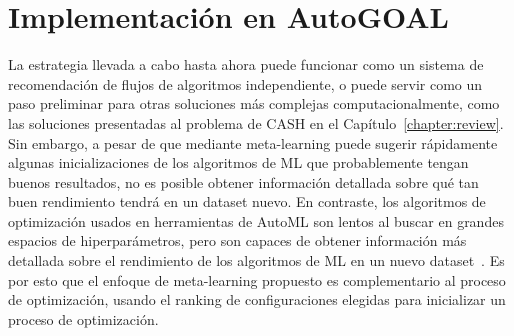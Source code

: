
\section{Implementación en AutoGOAL}\label{sec:autogoal_imp}


La estrategia llevada a cabo hasta ahora puede funcionar como un sistema de recomendación de flujos de algoritmos independiente, o puede servir como un paso preliminar para otras soluciones más complejas computacionalmente, como las soluciones presentadas al problema de CASH en el Capítulo~\ref{chapter:review}. Sin embargo, a pesar de que mediante meta-learning puede sugerir rápidamente algunas inicializaciones de los algoritmos de ML que probablemente tengan buenos resultados, no es posible obtener información detallada sobre qué tan buen rendimiento tendrá en un dataset nuevo. En contraste, los algoritmos de optimización usados en herramientas de AutoML son lentos al buscar en grandes espacios de hiperparámetros, pero son capaces de obtener información más detallada sobre el rendimiento de los algoritmos de ML en un nuevo dataset~\cite{fuerer2015efficient}. Es por esto que el enfoque de meta-learning propuesto es complementario al proceso de optimización, usando el ranking de configuraciones elegidas para inicializar un proceso de optimización.

